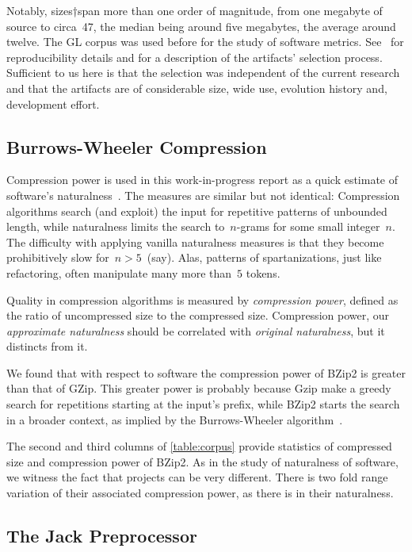 Notably, sizes†span more than one
order of magnitude, from one megabyte of source to circa~47, the median being
around five megabytes, the average around twelve. The GL corpus was used before
for the study of software metrics.  See~\cite{Gil:Lalouche:16,Gil:Lalouche:16b}
for reproducibility details and for a description of the artifacts' selection
process. Sufficient to us here is that the selection was independent of the
current research and that the artifacts are of considerable size, wide use,
evolution history and, development effort.

\subsection{Burrows-Wheeler Compression}
Compression power is used in this work-in-progress report as a quick estimate
of software's naturalness~\cite{Hindle:Bar:Su:Gabel:Devanbu:12}. The measures
are similar but not identical: Compression algorithms search (and exploit) the
input for repetitive patterns of unbounded length, while naturalness limits the
search to~$n$-grams for some small integer~$n$. The difficulty with applying
vanilla naturalness measures is that they become prohibitively slow
for~$n>5$~(say). Alas, patterns of spartanizations, just like refactoring,
often manipulate many more than~$5$ tokens.

Quality in compression algorithms is measured by \emph{compression power},
defined as the ratio of uncompressed size to the compressed size. Compression
power, our \emph{approximate naturalness} should be correlated with
\emph{original naturalness}, but it distincts from it.

We found that with respect to \Java software the compression power of BZip2 is
greater than that of GZip. This greater power is probably because Gzip make a
greedy search for repetitions starting at the input's prefix, while BZip2
starts the search in a broader context, as implied by the Burrows-Wheeler
algorithm~\cite{Burrows:Wheeler:94}.

The second and third columns of \cref{table:corpus} provide statistics of
compressed size and compression power of BZip2. As in
the study of naturalness of software, we witness the fact that projects can be
very different. There is two fold range variation of their associated
compression power, as there is in their naturalness.

\subsection{The Jack Preprocessor}

